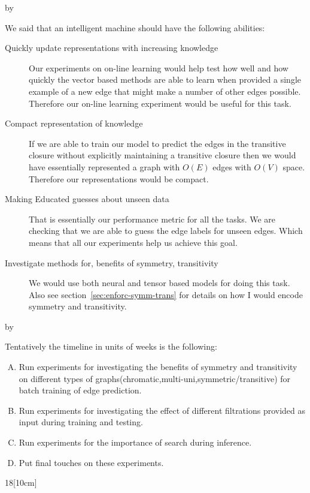 \documentclass[12pt]{exam} %
\makeatletter
\def\SetTotalwidth{\advance\linewidth by \@totalleftmargin
\@totalleftmargin=0pt}
\newcommand{\answer}[1]{
\ifprintanswers
\SetTotalwidth
  \begin{solution}[0in]#1\end{solution}
\else \fi
}
\makeatother
\begin{document}
\begin{questions}
\answer{We said that an intelligent machine should have the following
  abilities:
  \begin{description}
  \item[Quickly update representations with increasing knowledge] Our
    experiments on on-line learning would help test how well and how
    quickly the vector based methods are able to learn when provided a
    single example of a new edge that might make a number of other
    edges possible. Therefore our on-line learning experiment would be
    useful for this task.
  \item [Compact representation of knowledge] If we are able to train
  our model to predict the edges in the transitive closure without
  explicitly maintaining a transitive closure then we would have
  essentially represented a graph with $O(E)$ edges with $O(V)$
  space. Therefore our representations would be compact.
\item [Making Educated guesses about unseen data] That is essentially
  our performance metric for all the tasks. We are checking that we
  are able to guess the edge labels for unseen edges. Which means that
  all our experiments help us achieve this goal.
\item [Investigate methods for, benefits of symmetry, transitivity]
  We would use both neural and tensor based models for doing this
  task. Also see section~\ref{sec:enforc-symm-trans} for details on how I would
  encode symmetry and transitivity.
  \end{description}
}

\answer{
  Tentatively the timeline in units of weeks is the following:
  \begin{enumerate}[A)]
  \item Run experiments for investigating the benefits of symmetry and
    transitivity on different types of
    graphs(chromatic,multi-uni,symmetric/transitive) for batch
    training of edge prediction.
  \item Run experiments for investigating the effect of different
    filtrations provided as input during training and testing.
  \item Run experiments for the importance of search during inference.
  \item Put final touches on these experiments.
  \end{enumerate}
  \begin{chronology}[1]{1}{8}{\textwidth}[10cm]
    \event{2}{\large{A}}
    \event{4}{\large{B}}
    \event{6}{\large{C}}
    \event{8}{\large{D}}
  \end{chronology}
}


\end{questions}
\end{document}

